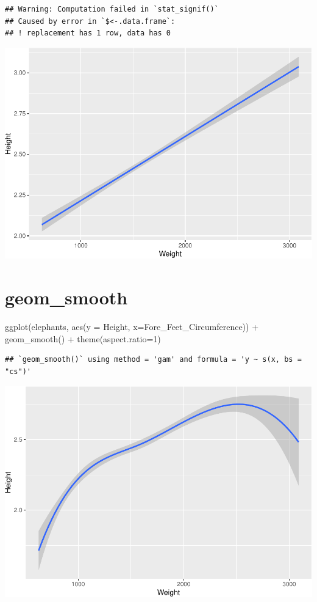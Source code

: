 \documentclass[
]{book}
\newenvironment{Shaded}{\begin{snugshade}}{\end{snugshade}}
\newcommand{\AttributeTok}[1]{\textcolor[rgb]{0.77,0.63,0.00}{#1}}
\newcommand{\DecValTok}[1]{\textcolor[rgb]{0.00,0.00,0.81}{#1}}
\newcommand{\FunctionTok}[1]{\textcolor[rgb]{0.00,0.00,0.00}{#1}}
\newcommand{\NormalTok}[1]{#1}
\newcommand{\SpecialCharTok}[1]{\textcolor[rgb]{0.00,0.00,0.00}{#1}}
\begin{document}
\begin{verbatim}
## Warning: Computation failed in `stat_signif()`
## Caused by error in `$<-.data.frame`:
## ! replacement has 1 row, data has 0
\end{verbatim}

\includegraphics{Data-Visualisation-geom-Encyclopedia_files/figure-latex/unnamed-chunk-48-1.pdf}

\hypertarget{smooth}{%
\section{geom\_smooth}\label{smooth}}

\begin{Shaded}
\begin{Highlighting}[]
\FunctionTok{ggplot}\NormalTok{(elephants, }\FunctionTok{aes}\NormalTok{(}\AttributeTok{y =}\NormalTok{ Height, }\AttributeTok{x=}\NormalTok{Fore\_Feet\_Circumference)) }\SpecialCharTok{+} 
  \FunctionTok{geom\_smooth}\NormalTok{() }\SpecialCharTok{+} \FunctionTok{theme}\NormalTok{(}\AttributeTok{aspect.ratio=}\DecValTok{1}\NormalTok{)}
\end{Highlighting}
\end{Shaded}

\begin{verbatim}
## `geom_smooth()` using method = 'gam' and formula = 'y ~ s(x, bs = "cs")'
\end{verbatim}

\includegraphics{Data-Visualisation-geom-Encyclopedia_files/figure-latex/unnamed-chunk-49-1.pdf}
\end{document}
